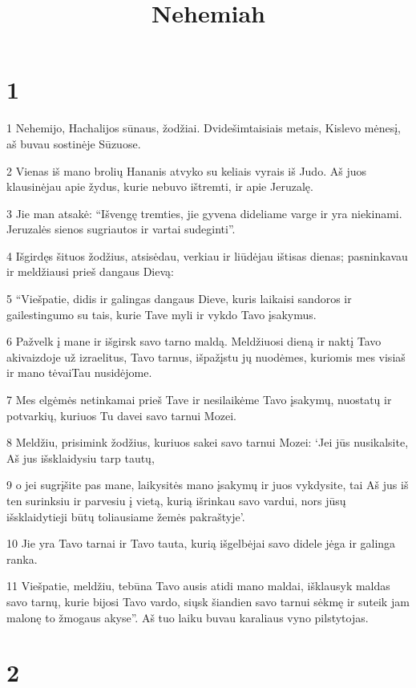 

\title{Nehemiah}

\chapter{1}


\par 1 Nehemijo, Hachalijos sūnaus, žodžiai. Dvidešimtaisiais metais, Kislevo mėnesį, aš buvau sostinėje Sūzuose. 
\par 2 Vienas iš mano brolių Hananis atvyko su keliais vyrais iš Judo. Aš juos klausinėjau apie žydus, kurie nebuvo ištremti, ir apie Jeruzalę. 
\par 3 Jie man atsakė: “Išvengę tremties, jie gyvena dideliame varge ir yra niekinami. Jeruzalės sienos sugriautos ir vartai sudeginti”. 
\par 4 Išgirdęs šituos žodžius, atsisėdau, verkiau ir liūdėjau ištisas dienas; pasninkavau ir meldžiausi prieš dangaus Dievą: 
\par 5 “Viešpatie, didis ir galingas dangaus Dieve, kuris laikaisi sandoros ir gailestingumo su tais, kurie Tave myli ir vykdo Tavo įsakymus. 
\par 6 Pažvelk į mane ir išgirsk savo tarno maldą. Meldžiuosi dieną ir naktį Tavo akivaizdoje už izraelitus, Tavo tarnus, išpažįstu jų nuodėmes, kuriomis mes visi­aš ir mano tėvai­Tau nusidėjome. 
\par 7 Mes elgėmės netinkamai prieš Tave ir nesilaikėme Tavo įsakymų, nuostatų ir potvarkių, kuriuos Tu davei savo tarnui Mozei. 
\par 8 Meldžiu, prisimink žodžius, kuriuos sakei savo tarnui Mozei: ‘Jei jūs nusikalsite, Aš jus išsklaidysiu tarp tautų, 
\par 9 o jei sugrįšite pas mane, laikysitės mano įsakymų ir juos vykdysite, tai Aš jus iš ten surinksiu ir parvesiu į vietą, kurią išrinkau savo vardui, nors jūsų išsklaidytieji būtų toliausiame žemės pakraštyje’. 
\par 10 Jie yra Tavo tarnai ir Tavo tauta, kurią išgelbėjai savo didele jėga ir galinga ranka. 
\par 11 Viešpatie, meldžiu, tebūna Tavo ausis atidi mano maldai, išklausyk maldas savo tarnų, kurie bijosi Tavo vardo, siųsk šiandien savo tarnui sėkmę ir suteik jam malonę to žmogaus akyse”. Aš tuo laiku buvau karaliaus vyno pilstytojas.


\chapter{2}

